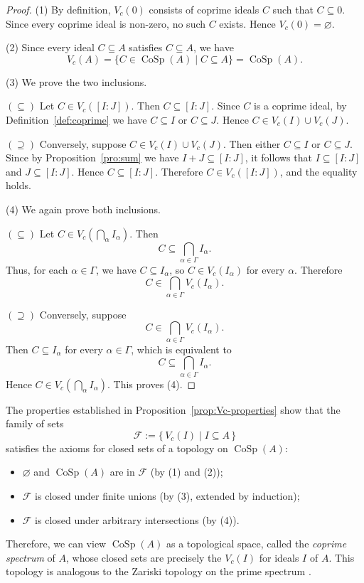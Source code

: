 \documentclass{amsart}
\begin{document}
\begin{proof}
(1) By definition, $V_c(0)$ consists of coprime ideals $C$ such that $C \subseteq 0$. Since every coprime ideal is non-zero, no such $C$ exists. Hence $V_c(0) = \varnothing$.

(2) Since every ideal $C \subseteq A$ satisfies $C \subseteq A$, we have
\[
V_c(A) = \{ C \in \operatorname{CoSp}(A) \mid C \subseteq A \} = \operatorname{CoSp}(A).
\]

(3) We prove the two inclusions.

$(\subseteq)$ Let $C \in V_c([I:J])$. Then $C \subseteq [I:J]$. Since $C$ is a coprime ideal, by Definition~\ref{def:coprime} we have $C \subseteq I$ or $C \subseteq J$. Hence $C \in V_c(I) \cup V_c(J)$.

$(\supseteq)$ Conversely, suppose $C \in V_c(I) \cup V_c(J)$. Then either $C \subseteq I$ or $C \subseteq J$. Since by Proposition~\ref{pro:sum} we have $I+J \subseteq [I:J]$, it follows that $I \subseteq [I:J]$ and $J \subseteq [I:J]$. Hence $C \subseteq [I:J]$. Therefore $C \in V_c([I:J])$, and the equality holds.

(4) We again prove both inclusions.

$(\subseteq)$ Let $C \in V_c\!\left(\bigcap_{\alpha} I_\alpha\right)$. Then
\[
C \subseteq \bigcap_{\alpha \in \Gamma} I_\alpha.
\]
Thus, for each $\alpha \in \Gamma$, we have $C \subseteq I_\alpha$, so $C \in V_c(I_\alpha)$ for every $\alpha$. Therefore
\[
C \in \bigcap_{\alpha \in \Gamma} V_c(I_\alpha).
\]

$(\supseteq)$ Conversely, suppose
\[
C \in \bigcap_{\alpha \in \Gamma} V_c(I_\alpha).
\]
Then $C \subseteq I_\alpha$ for every $\alpha \in \Gamma$, which is equivalent to
\[
C \subseteq \bigcap_{\alpha \in \Gamma} I_\alpha.
\]
Hence $C \in V_c\!\left(\bigcap_{\alpha} I_\alpha\right)$. This proves (4).
\end{proof}

The properties established in Proposition~\ref{prop:Vc-properties} show that the family of sets
\[
\mathcal{F} := \{\, V_c(I) \mid I \subseteq A \,\}
\]
satisfies the axioms for closed sets of a topology on $\operatorname{CoSp}(A)$:
\begin{itemize}
  \item $\varnothing$ and $\operatorname{CoSp}(A)$ are in $\mathcal{F}$ (by (1) and (2));
  \item $\mathcal{F}$ is closed under finite unions (by (3), extended by induction);
  \item $\mathcal{F}$ is closed under arbitrary intersections (by (4)).
\end{itemize}
Therefore, we can view $\operatorname{CoSp}(A)$ as a topological space, called the \emph{coprime spectrum} of $A$, whose closed sets are precisely the $V_c(I)$ for ideals $I$ of $A$. This topology is analogous to the Zariski topology on the prime spectrum \cite{atiyah2018introduction}.
\end{document}
